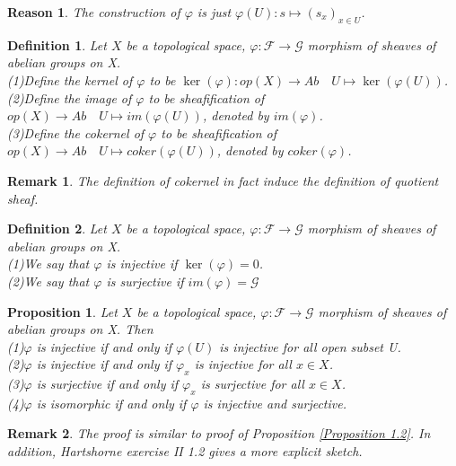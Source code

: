 \documentclass{ctexart}
\newtheorem{definition}{Definition}[section]
\newtheorem{remark}{Remark}[section]
\newtheorem{proposition}{Proposition}[section]
\newtheorem{reason}{Reason}[section]
\begin{document}
\begin{reason}
    The construction of $\varphi$ is just $\varphi(U): s \longmapsto (s_{x})_{x\in U}$.
\end{reason}
\begin{definition}
    Let $X$ be a topological space, $\varphi: \mathcal{F} \longrightarrow \mathcal{G}$ morphism of sheaves of abelian groups on X. \\
    (1)Define the kernel of $\varphi$ to be $\ker(\varphi): op(X) \longrightarrow Ab\quad U \longmapsto \ker(\varphi(U))$. \\
    (2)Define the image of $\varphi$ to be sheafification of $op(X) \longrightarrow Ab\quad U \longmapsto im(\varphi(U))$, denoted by $im(\varphi)$. \\
    (3)Define the cokernel of $\varphi$ to be sheafification of $op(X) \longrightarrow Ab\quad U \longmapsto coker(\varphi(U))$, denoted by $coker(\varphi)$.
\end{definition}
\begin{remark}
    The definition of cokernel in fact induce the definition of quotient sheaf.
\end{remark}
\begin{definition}
    Let $X$ be a topological space, $\varphi: \mathcal{F} \longrightarrow \mathcal{G}$ morphism of sheaves of abelian groups on X. \\
    (1)We say that $\varphi$ is injective if $\ker(\varphi) = 0$. \\
    (2)We say that $\varphi$ is surjective if $im(\varphi) = \mathcal{G}$
\end{definition}
\begin{proposition}
    Let $X$ be a topological space, $\varphi: \mathcal{F} \longrightarrow \mathcal{G}$ morphism of sheaves of abelian groups on X.
    Then \\
    (1)$\varphi$ is injective if and only if $\varphi(U)$ is injective for all open subset U. \\
    (2)$\varphi$ is injective if and only if $\varphi_{x}$ is injective for all $x\in X$. \\
    (3)$\varphi$ is surjective if and only if $\varphi_{x}$ is surjective for all $x\in X$. \\
    (4)$\varphi$ is isomorphic if and only if $\varphi$ is injective and surjective.
    \label{Proposition 1.4}
\end{proposition}
\begin{remark}
    The proof is similar to proof of Proposition \ref{Proposition 1.2}.
    In addition, Hartshorne exercise II 1.2 gives a more explicit sketch.
\end{remark}
\end{document}
